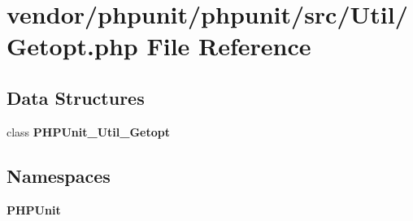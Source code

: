 \section{vendor/phpunit/phpunit/src/\+Util/\+Getopt.php File Reference}
\label{_getopt_8php}
\subsection*{Data Structures}
\begin{DoxyCompactItemize}
\item 
class {\bf P\+H\+P\+Unit\+\_\+\+Util\+\_\+\+Getopt}
\end{DoxyCompactItemize}
\subsection*{Namespaces}
\begin{DoxyCompactItemize}
\item 
 {\bf P\+H\+P\+Unit}
\end{DoxyCompactItemize}

